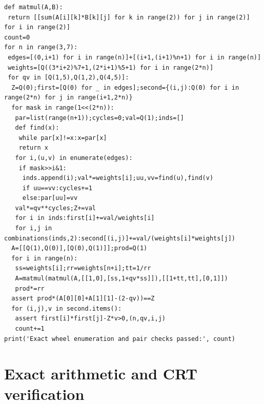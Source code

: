 \documentclass[11pt,a4paper]{article}
\theoremstyle{definition}
\theoremstyle{remark}\newtheorem{remark}[theorem]{Remark}
\begin{document}
\begin{lstlisting}
def matmul(A,B):
 return [[sum(A[i][k]*B[k][j] for k in range(2)) for j in range(2)] for i in range(2)]
count=0
for n in range(3,7):
 edges=[(0,i+1) for i in range(n)]+[(i+1,(i+1)%n+1) for i in range(n)]
 weights=[Q((3*i+2)%7+1,(2*i+1)%5+1) for i in range(2*n)]
 for qv in [Q(1,5),Q(1,2),Q(4,5)]:
  Z=Q(0);first=[Q(0) for _ in edges];second={(i,j):Q(0) for i in range(2*n) for j in range(i+1,2*n)}
  for mask in range(1<<(2*n)):
   par=list(range(n+1));cycles=0;val=Q(1);inds=[]
   def find(x):
    while par[x]!=x:x=par[x]
    return x
   for i,(u,v) in enumerate(edges):
    if mask>>i&1:
     inds.append(i);val*=weights[i];uu,vv=find(u),find(v)
     if uu==vv:cycles+=1
     else:par[uu]=vv
   val*=qv**cycles;Z+=val
   for i in inds:first[i]+=val/weights[i]
   for i,j in combinations(inds,2):second[(i,j)]+=val/(weights[i]*weights[j])
  A=[[Q(1),Q(0)],[Q(0),Q(1)]];prod=Q(1)
  for i in range(n):
   ss=weights[i];rr=weights[n+i];tt=1/rr
   A=matmul(matmul(A,[[1,0],[ss,1+qv*ss]]),[[1+tt,tt],[0,1]])
   prod*=rr
  assert prod*(A[0][0]+A[1][1]-(2-qv))==Z
  for (i,j),v in second.items():
   assert first[i]*first[j]-Z*v>0,(n,qv,i,j)
   count+=1
print('Exact wheel enumeration and pair checks passed:', count)
\end{lstlisting}

\section{Exact arithmetic and CRT verification}
\end{document}
